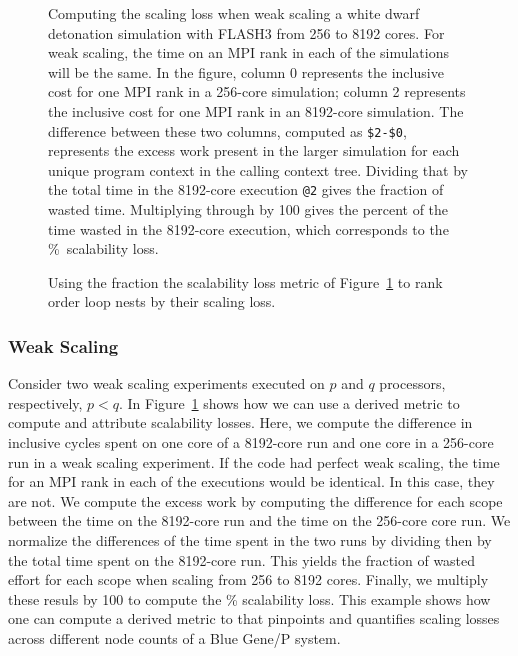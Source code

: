 \documentclass[11pt,letterpaper]{report}
\begin{document}
\begin{figure}[t]
\caption{Computing the scaling loss when weak scaling a white dwarf detonation simulation with FLASH3  from 256 to 8192 cores. For weak scaling, the time on an MPI rank in each of the simulations will be the same. In the figure, column 0 represents the inclusive cost for one MPI rank in a 256-core simulation; column 2 represents the inclusive cost for one MPI rank in an 8192-core simulation.  The difference between these two columns, computed as {\tt \$2-\$0},
represents the excess work present in the larger simulation for each unique program context in the calling context tree. Dividing that by the total time in the 8192-core execution {\tt @2} gives the fraction of wasted  time. Multiplying through by 100 gives the percent of the time wasted in the 8192-core execution, which corresponds to the \%~scalability loss.}
\label{fig:scaling-loss}
\end{figure}

\begin{figure}[t]
\caption{Using the fraction the scalability loss metric of Figure~\ref{fig:scaling-loss} to rank order loop nests by their scaling loss.}
\label{fig:scaling-loss-2}
\end{figure}


\subsubsection*{Weak Scaling}

Consider two weak scaling experiments executed on $p$ and $q$ processors, respectively, $p<q$.
In Figure~\ref{fig:scaling-loss} shows how we can use a derived metric to compute and attribute scalability losses.
Here, we compute the difference in inclusive cycles spent on one core of a 8192-core run and one core in a 256-core run in a weak scaling experiment.
If the code had perfect weak scaling, the time for an MPI rank in each of the executions would be identical. In this case, they are not. 
We compute the excess work by computing the difference for each scope between the time on the 8192-core  run and the time on the 256-core core run. 
We normalize the differences of the time spent in the two runs by dividing then by the total time spent on the 8192-core  run. This yields the fraction of wasted effort 
for each scope when scaling from 256 to 8192 cores. Finally, we multiply these resuls by 100 to compute the \% scalability loss.
This example shows how one can compute a derived metric to that pinpoints and quantifies scaling losses across different node counts of a Blue Gene/P system.
\end{document}
